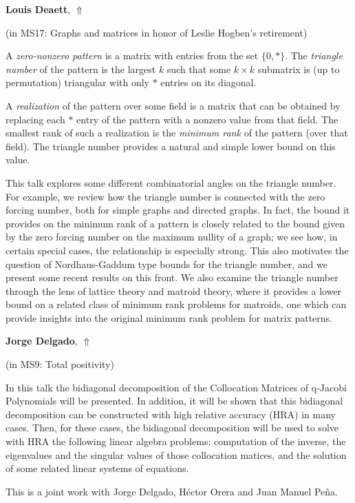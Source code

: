 \documentclass[ILAS2025-program.tex]{subfiles}
\begin{document}
     \hypertarget{down0177}{}\begin{ilasabstract}
    
    \textbf{Louis Deaett},  \hfill \hyperlink{up0177}{$\Uparrow$}
    
    (in {\color{mstitle}MS17: Graphs and matrices in honor of Leslie Hogben's retirement})
        
        \mtskip
    A \emph{zero-nonzero pattern} is a matrix with entries from the set $\{0,*\}$.  The \emph{triangle number} of the pattern is the largest $k$ such that some $k\times k$ submatrix is (up to permutation) triangular with only $*$ entries on its diagonal.


A \emph{realization} of the pattern over some field is a matrix that can be obtained by replacing each $*$ entry of the pattern with a nonzero value from that field.
The smallest rank of such a realization is the \emph{minimum rank} of the pattern (over that field).  The triangle number provides a natural and simple lower bound on this value.

This talk explores some different combinatorial angles on the triangle number.  For example, we review how the triangle number is connected with the zero forcing number, both for simple graphs and directed graphs.  In fact, the bound it provides on the minimum rank of a pattern is closely related to the bound given by the zero forcing number on the maximum nullity of a graph; we see how, in certain special cases, the relationship is especially strong.  This also motivates the question of Nordhaus-Gaddum type bounds for the triangle number, and we present some recent results on this front.  We also examine the triangle number through the lens of lattice theory and matroid theory, where it provides a lower bound on a related class of minimum rank problems for matroids, one which can provide insights into the original minimum rank problem for matrix patterns.
\end{ilasabstract}
     \hypertarget{down0043}{}\begin{ilasabstract}
    
    \textbf{Jorge Delgado},  \hfill \hyperlink{up0043}{$\Uparrow$}
    
    (in {\color{mstitle}MS9: Total positivity})
        
        \mtskip
    In this talk the bidiagonal decomposition of the Collocation Matrices of q-Jacobi Polynomials will be presented.
In addition, it will be shown that this bidiagonal decomposition can be constructed with high relative accuracy (HRA)
in many cases.
Then, for these cases, the bidiagonal decomposition will be used to solve with HRA the following linear algebra
problems: computation of the inverse, the eigenvalues and the singular values of those collocation matices, and
the solution of some related linear systems of equations.

This is a joint work with Jorge Delgado, Héctor Orera and Juan Manuel Peña.\end{ilasabstract}
\end{document}
